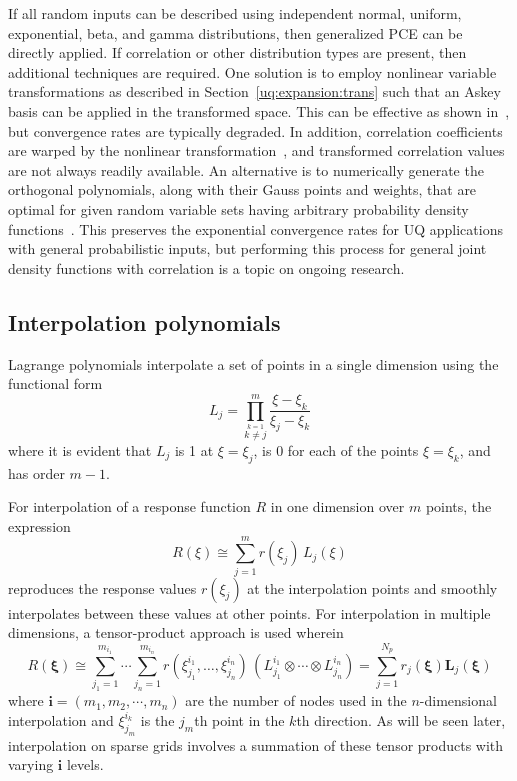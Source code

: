 If all random inputs can be described using independent normal,
uniform, exponential, beta, and gamma distributions, then generalized
PCE can be directly applied.  If correlation or other distribution
types are present, then additional techniques are required.  One
solution is to employ nonlinear variable transformations as described
in Section~\ref{uq:expansion:trans} such that an Askey basis can be applied in
the transformed space.  This can be effective as shown
in~\cite{Eld07}, but convergence rates are typically degraded.  In
addition, correlation coefficients are warped by the nonlinear
transformation~\cite{Der86}, and transformed correlation values are
not always readily available.  An alternative is to numerically
generate the orthogonal polynomials, along with their Gauss points and
weights, that are optimal for given random variable sets having
arbitrary probability density functions~\cite{gautschi_book,GolubWelsch69}.
This preserves the exponential convergence rates for UQ applications 
with general probabilistic inputs,
but performing this process for general joint density functions with 
correlation is a topic on ongoing research. 

\subsection{Interpolation polynomials} \label{uq:expansion:interp}

Lagrange polynomials interpolate a set of points in a single dimension
using the functional form
\begin{equation}
L_j = \prod_{\stackrel{\scriptstyle k=1}{k \ne j}}^m 
\frac{\xi - \xi_k}{\xi_j - \xi_k} \label{eq:lagrange_poly_1d}
\end{equation}
where it is evident that $L_j$ is 1 at $\xi = \xi_j$, is 0 for each of
the points $\xi = \xi_k$, and has order $m - 1$.

For interpolation of a response function $R$ in one dimension over $m$
points, the expression
\begin{equation}
R(\xi) \cong \sum_{j=1}^m r(\xi_j)\,L_j(\xi) \label{eq:lagrange_interp_1d}
\end{equation}
reproduces the response values $r(\xi_j)$ at the interpolation points
and smoothly interpolates between these values at other points.  For
interpolation in multiple dimensions, a tensor-product approach is
used wherein
\begin{equation}
R(\boldsymbol{\xi}) \cong \sum_{j_1=1}^{m_{i_1}}\cdots\sum_{j_n=1}^{m_{i_n}}
r\left(\xi^{i_1}_{j_1},\dots , \xi^{i_n}_{j_n}\right)\,
\left(L^{i_1}_{j_1}\otimes\cdots\otimes L^{i_n}_{j_n}\right)
= \sum_{j=1}^{N_p} r_j(\boldsymbol{\xi}) \boldsymbol{L}_j(\boldsymbol{\xi})
\label{eq:lagrange_interp_nd}
\end{equation}
where $\boldsymbol{i} = (m_1, m_2, \cdots, m_n)$ are the number of nodes
used in the $n$-dimensional interpolation and $\xi^{i_k}_{j_m}$ is the 
$j_m$th point in the $k$th direction.  As will be seen later, interpolation 
on sparse grids involves a summation of these tensor products with varying 
$\boldsymbol{i}$ levels.


